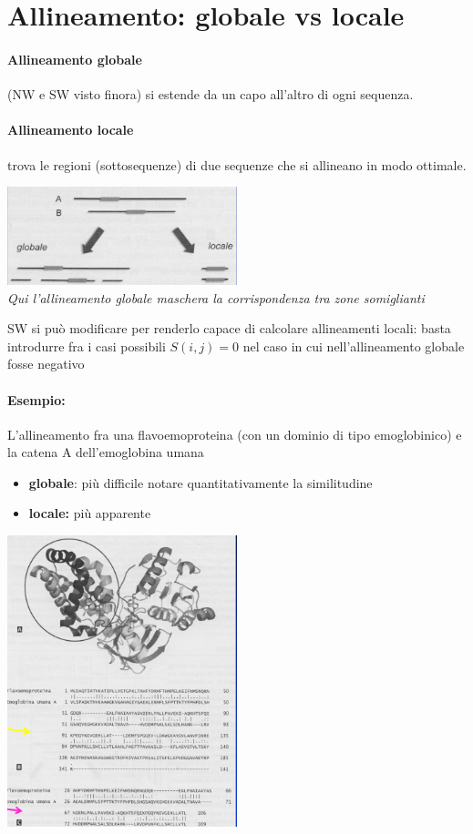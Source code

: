 \documentclass{article}
\begin{document}
\section{Allineamento: globale vs locale}
\paragraph{Allineamento globale} (NW e SW visto finora) si estende da un
capo all'altro di ogni sequenza.
\paragraph{Allineamento locale} trova le regioni (sottosequenze) di due
sequenze che si allineano in modo ottimale.
\begin{center}
    \includegraphics[width=0.5\textwidth]{figures/gl.png}\\
    \textit{Qui l'allineamento
    globale maschera la
    corrispondenza tra
    zone somiglianti}
\end{center}
SW si può modificare per renderlo capace di calcolare
allineamenti locali: basta introdurre fra i casi possibili $S(i,j)=0$ nel
caso in cui nell'allineamento globale fosse negativo
\paragraph{Esempio:} L'allineamento fra una
flavoemoproteina (con
un dominio di tipo
emoglobinico) e la
catena A
dell'emoglobina umana
\begin{itemize}
    \item \textbf{globale}: più difficile
    notare
    quantitativamente la
    similitudine
    \item \textbf{locale:} più apparente
\end{itemize}
\begin{center}
    \includegraphics[width=0.5\textwidth]{figures/es1.png}\\
\end{center}
\end{document}
